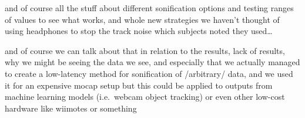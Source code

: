 \documentclass[10pt,a4paper,onecolumn]{article}
\begin{document}
and of course all the stuff about different sonification options and testing ranges of values to see what works, and whole new strategies we haven't thought of using headphones to stop the track noise which subjects noted they used\ldots{}

and of course we can talk about that in relation to the results, lack of results, why we might be seeing the data we see,
and especially that we actually managed to create a low-latency method for sonification of /arbitrary/ data, and we used it for an expensive mocap setup but this could be applied to outputs from machine learning models (i.e.~webcam object tracking) or even other low-cost hardware like wiimotes or something
\balance
\clearpage


\printbibliography[title=References,heading=bibintoc]
\end{document}
